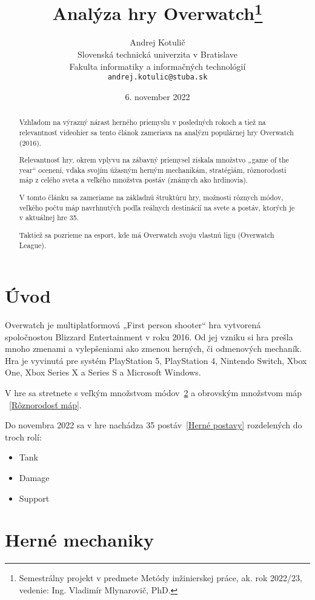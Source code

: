 \documentclass[10pt,oneside,slovak,a4paper]{article}
\title{Analýza hry Overwatch\thanks{Semestrálny projekt v predmete Metódy inžinierskej práce, ak. rok 2022/23, vedenie: Ing. Vladimír Mlynarovič, PhD.}} %
\author{Andrej Kotulič\\[2pt]
	{\small Slovenská technická univerzita v Bratislave}\\
	{\small Fakulta informatiky a informačných technológií}\\
	{\small \texttt{andrej.kotulic@stuba.sk}}
	}
\date{\small 6. november 2022} %
\begin{document}
\maketitle

\begin{abstract}
Vzhľadom na výrazný nárast herného priemyslu v posledných rokoch a tiež na relevantnosť videohier sa tento článok zameriava na analýzu populárnej hry Overwatch (2016). 

Relevantnosť hry, okrem vplyvu na zábavný priemysel získala množstvo „game of the year“ ocenení, vďaka svojím úžasným herným mechanikám, stratégiám, rôznorodosti máp z celého sveta a veľkého množstva postáv (známych ako hrdinovia).

V tomto článku sa zameriame na základnú štruktúru hry, možnosti rôznych módov, veľkého počtu máp navrhnutých podľa reálnych destinácií na svete a postáv, ktorých je v aktuálnej hre 35. 

Taktiež sa pozrieme na esport, kde má Overwatch svoju vlastnú ligu (Overwatch League).
\end{abstract}



\section{Úvod}

Overwatch je multiplatformová „First person shooter“ hra vytvorená spoločnostou Blizzard Entertainment  v roku 2016.
Od jej vzniku si hra prešla mnoho zmenami a vylepšeniami ako zmenou herných, či odmenových mechaník.
Hra je vyvinutá pre systém PlayStation 5, PlayStation 4, Nintendo Switch, Xbox One, Xbox Series X a Series S a Microsoft Windows.

V hre sa stretnete s veľkým množstvom módov~\ref{Herné mechaniky} a obrovským množstvom máp ~\ref{Rôznorodosť máp}.

Do novembra 2022 sa v hre nachádza 35 postáv~\ref{Herné postavy} rozdelených do troch rolí:
\begin{itemize}
\item Tank
\item Damage
\item Support
\end{itemize}




\section{Herné mechaniky} \label{Herné mechaniky}
\end{document}
